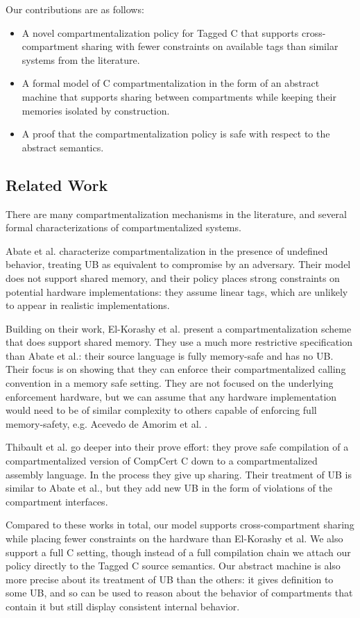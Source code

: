 \documentclass{article}
\begin{document}
Our contributions are as follows:
\begin{itemize}
\item A novel compartmentalization policy for Tagged C that supports cross-compartment
  sharing with fewer constraints on available tags than similar systems from the literature.
\item A formal model of C compartmentalization in the form of an abstract machine that
  supports sharing between compartments while keeping their memories isolated by construction.
\item A proof that the compartmentalization policy is safe with respect to the abstract semantics.
\end{itemize}

\subsection{Related Work}

There are many compartmentalization mechanisms in the literature, and several formal
characterizations of compartmentalized systems.

Abate et al. \cite{} characterize compartmentalization in the presence of undefined
behavior, treating UB as equivalent to compromise by an adversary. Their model does
not support shared memory, and their policy places strong constraints on potential
hardware implementations: they assume linear tags, which are unlikely to appear
in realistic implementations.

Building on their work, El-Korashy et al. \cite{} present a compartmentalization
scheme that does support shared memory. They use a much more restrictive specification
than Abate et al.: their source language is fully memory-safe and has no UB. Their
focus is on showing that they can enforce their compartmentalized calling convention
in a memory safe setting. They are not focused on the underlying enforcement hardware,
but we can assume that any hardware implementation would need to be of similar complexity
to others capable of enforcing full memory-safety, e.g. Acevedo de Amorim et al. \cite{}. 

Thibault et al. \cite{} go deeper into their prove effort: they prove safe compilation of a
compartmentalized version of CompCert C down to a compartmentalized assembly language.
In the process they give up sharing. Their treatment of UB is similar to Abate et al.,
but they add new UB in the form of violations of the compartment interfaces.

Compared to these works in total, our model supports cross-compartment sharing while placing
fewer constraints on the hardware than El-Korashy et al. We also support a full C setting,
though instead of a full compilation chain we attach our policy directly to the Tagged C
source semantics. Our abstract machine is also more precise about its treatment of UB than
the others: it gives definition to some UB, and so can be used to reason about the behavior
of compartments that contain it but still display consistent internal behavior.
\end{document}

